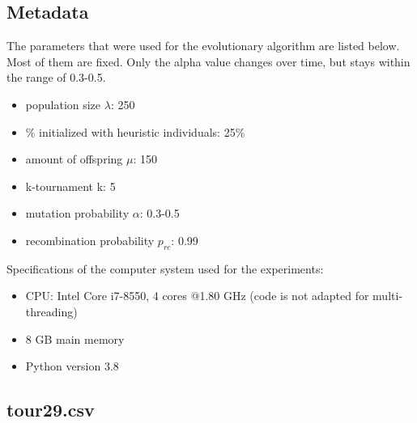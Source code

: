 \documentclass[a4paper,10pt]{article}
\newcommand{\ReplaceMe}[1]{{\color{blue}#1}}
\begin{document}
\subsection{Metadata}


The parameters that were used for the evolutionary algorithm are listed below. Most of them are fixed. Only the alpha value changes over time, but stays within the range of 0.3-0.5.
\begin{itemize}
    \item population size $\lambda$: 250
    \item \% initialized with heuristic individuals: 25\%
    \item amount of offspring $\mu$: 150
    \item k-tournament k: 5
    \item mutation probability $\alpha$: 0.3-0.5
    \item recombination probability $p_{rc}$: 0.99
\end{itemize}
Specifications of the computer system used for the experiments:
\begin{itemize}
    \item CPU: Intel Core i7-8550, 4 cores @1.80 GHz (code is not adapted for multi-threading)
    \item 8 GB main memory
    \item Python version 3.8
\end{itemize}


\subsection{tour29.csv}

\end{document}
